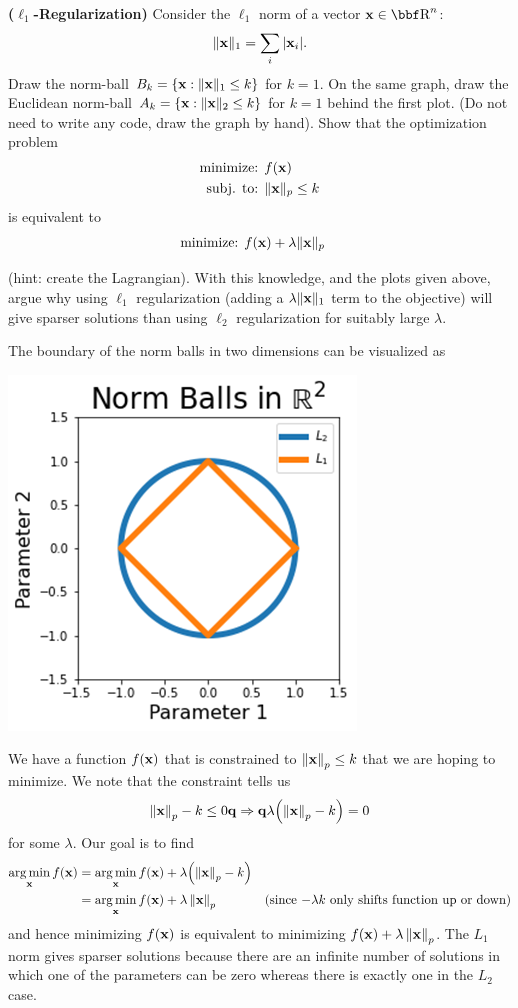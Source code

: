 \documentclass[12pt,letterpaper,fleqn]{hmcpset}
\begin{document}
\begin{problem}[2]
\textbf{($\ell_1$-Regularization)} Consider the $\ell_1$ norm of a vector $\xx\in\RR^n$:
\[
    \|{\bf x}\|_1 = \sum_i |{\bf x}_i|.
\]
Draw the norm-ball $B_k = \{{\bf x} : \|{\bf x}\|_1 \leq k\}$ for $k=1$. On the same graph, draw the Euclidean norm-ball $A_k = \{{\bf x} : \|{\bf x}\|_2 \leq k\}$ for $k=1$ behind the first plot. (Do not need to write any code, draw the graph by hand).
\newline
\newline
Show that the optimization problem
\begin{align*}
    \text{minimize: } & f({\bf x})\\
    \text{subj. to: } & \|{\bf x}\|_p \leq k
\end{align*}
is equivalent to
\begin{align*}
    \text{minimize: } & f({\bf x}) + \lambda\|{\bf x}\|_p
\end{align*}

(hint: create the Lagrangian). With this knowledge, and the plots given above, argue why
using $\ell_1$ regularization (adding a $\lambda\|{\bf x}\|_1$ term to the objective) will give
sparser solutions than using $\ell_2$ regularization for suitably large $\lambda$.
\end{problem}
\begin{solution}
The boundary of the norm balls in two dimensions can be visualized as
\begin{center}
    \includegraphics[width = 2.in]{balls.png}
\end{center}

We have a function $f(\vb x)$ that is constrained to $\left\lVert\vb x\right\rVert_p \le k$ that we are hoping to minimize. We note that the constraint tells us
\begin{align*}
    \left\lVert\vb x\right\rVert_p - k \le 0{\bf q}{} \Rightarrow {\bf q}{} \lambda\qty(\left\lVert\vb x\right\rVert_p - k) = 0
\end{align*}
for some $\lambda$.
Our goal is to find 
\begin{align*}
    \operatorname*{arg\,min}_{\vb x} f(\vb x) &=  \operatorname*{arg\,min}_{\vb x} f(\vb x) + \lambda\qty(\left\lVert\vb x\right\rVert_p - k) \\
    &= \operatorname*{arg\,min}_{\vb x} f(\vb x) + \lambda\left\lVert\vb x\right\rVert_p &\text{(since $-\lambda k$ only shifts function up or down)}
\end{align*}
and hence minimizing $f(\vb x)$ is equivalent to minimizing $f(\vb x) + \lambda \left\lVert\vb x\right\rVert_p$. The $L_1$ norm gives sparser solutions because there are an infinite number of solutions in which one of the parameters can be zero whereas there is exactly one in the $L_2$ case.
\end{solution}
\newpage
\end{document}
